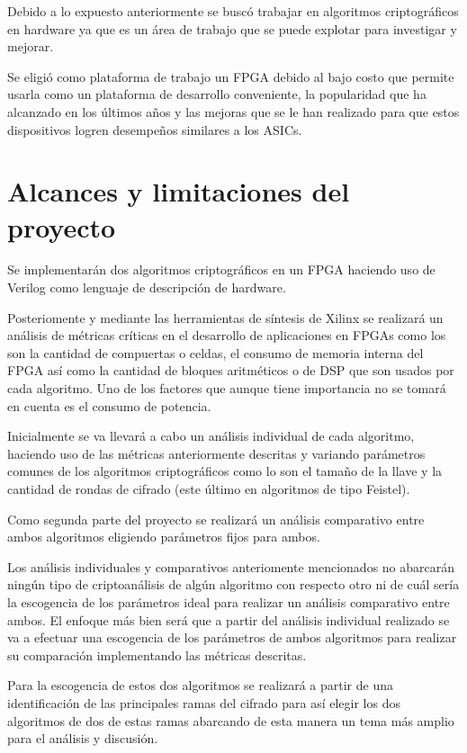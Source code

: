 Debido a lo expuesto anteriormente se buscó trabajar en algoritmos criptográficos en hardware ya que es un área de trabajo que se puede explotar para investigar y mejorar.

Se eligió como plataforma de trabajo un FPGA debido al bajo costo que permite usarla como un plataforma de desarrollo conveniente, la popularidad que ha alcanzado en los últimos años y las mejoras que se le han realizado para que estos dispositivos logren desempeños similares a los ASICs.

\section{Alcances y limitaciones del proyecto}
Se implementarán dos algoritmos criptográficos en un FPGA haciendo uso de Verilog como lenguaje de descripción de hardware. 

Posteriomente y mediante las herramientas de síntesis de Xilinx se realizará un análisis de métricas críticas en el desarrollo de aplicaciones en FPGAs como los son la cantidad de compuertas o celdas, el consumo de memoria interna del FPGA así como la cantidad de bloques aritméticos o de DSP que son usados por cada algoritmo. Uno de los factores que aunque tiene importancia no se tomará en cuenta es el consumo de potencia.

Inicialmente se va llevará a cabo un análisis individual de cada algoritmo, haciendo uso de las métricas anteriormente descritas y variando parámetros comunes de los algoritmos criptográficos como lo son el tamaño de la llave y la cantidad de rondas de cifrado (este último en algoritmos de tipo Feistel). 

Como segunda parte del proyecto se realizará un análisis comparativo entre ambos algoritmos eligiendo parámetros fijos para ambos.

Los análisis individuales y comparativos anteriomente mencionados no abarcarán ningún tipo de criptoanálisis de algún algoritmo con respecto otro ni de cuál sería la escogencia de los parámetros ideal para realizar un análisis comparativo entre ambos. El enfoque más bien será que a partir del análisis individual realizado se va a efectuar una escogencia de los parámetros de ambos algoritmos para realizar su comparación implementando las métricas descritas.

Para la escogencia de estos dos algoritmos se realizará a partir de una identificación de las principales ramas del cifrado para así elegir los dos algoritmos de dos de estas ramas abarcando de esta manera un tema más amplio para el análisis y discusión.

